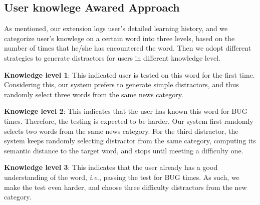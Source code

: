\subsection{User knowlege Awared Approach}
As mentioned, our extension logs user's detailed learning history, and we categorize user's knowlege  on a certain word into three levels, based on the number of times that he/she has encountered  the word.  Then we adopt different strategies to generate  distractors for users in different knowledge level. 



{\bf Knowledge level 1}: This indicated user is tested on this word for the first time. Considering this, our system prefers to generate simple distractors, and thus randomly select three words from the same news category. 

{\bf Knowlege level 2}: This indicates that the user has known this word for BUG times. Therefore, the testing is expected to be harder. Our system first randomly selects two words from the same news category. For the third distractor,  the system keeps randomly selecting distractor from the same category, computing its semantic distance to the target word, and stops until meeting a difficulty one.


{\bf Knowledge level 3}: This indicates that the user already has a good understanding of the word, {\it i.e.}, passing the test for BUG times. As such, we make the test even harder, and choose  three difficulty distractors from the new category. 



